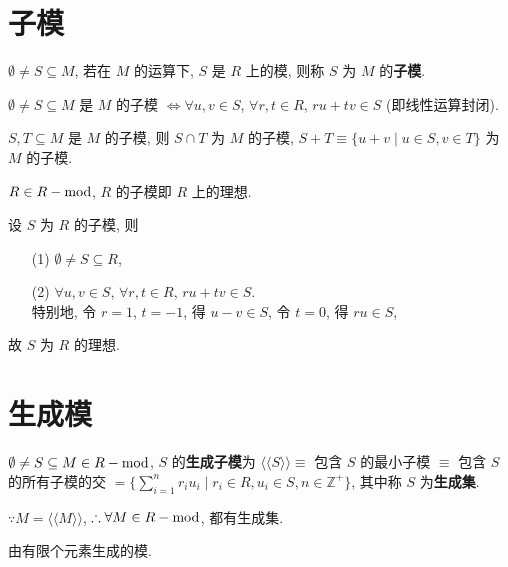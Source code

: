\documentclass{note}
\begin{document}
\section{子模}
\begin{df}[子模]
    $\emptyset\neq S\subseteq M$, 若在 $M$ 的运算下, $S$ 是 $R$ 上的模, 则称 $S$ 为 $M$ 的\textbf{子模}.
\end{df}

\begin{thm}
    $\emptyset\neq S\subseteq M$ 是 $M$ 的子模 $\Longleftrightarrow\forall u,v\in S$, $\forall r,t\in R$, $ru+tv\in S$ (即线性运算封闭).
\end{thm}

\begin{thm}[(课本定理 4.2)]
    $S,T\subseteq M$ 是 $M$ 的子模, 则 $S\cap T$ 为 $M$ 的子模, $S+T\equiv\{u+v\mid u\in S,v\in T\}$ 为 $M$ 的子模.
\end{thm}

\begin{thm}
    $R\in R-\operatorname{mod} $, $R$ 的子模即 $R$ 上的理想.
\end{thm}
\begin{pf}
    设 $S$ 为 $R$ 的子模, 则
    \begin{itemize}
        \item[(1)] $\emptyset\neq S\subseteq R$,
        \item[(2)] $\forall u,v\in S$, $\forall r,t\in R$, $ru+tv\in S$.\\
        特别地, 令 $r=1$, $t=-1$, 得 $u-v\in S$, 令 $t=0$, 得 $ru\in S$,
    \end{itemize}
    故 $S$ 为 $R$ 的理想.
\end{pf}

\section{生成模}
\begin{df}[生成子模和生成集]
    $\emptyset\neq S\subseteq M\in R-\operatorname{mod}$, $S$ 的\textbf{生成子模}为 $\langle\langle S\rangle\rangle\equiv$ 包含 $S$ 的最小子模 $\equiv$ 包含 $S$ 的所有子模的交 $=\{\sum_{i=1}^nr_iu_i\mid r_i\in R,u_i\in S,n\in\mathbb{Z}^+\}$, 其中称 $S$ 为\textbf{生成集}.
\end{df}

$\because M=\langle\langle M\rangle\rangle$, $\therefore\forall M\in R-\operatorname{mod}$, 都有生成集.

\begin{df}[有限生成模]
    由有限个元素生成的模.
\end{df}
\end{document}
